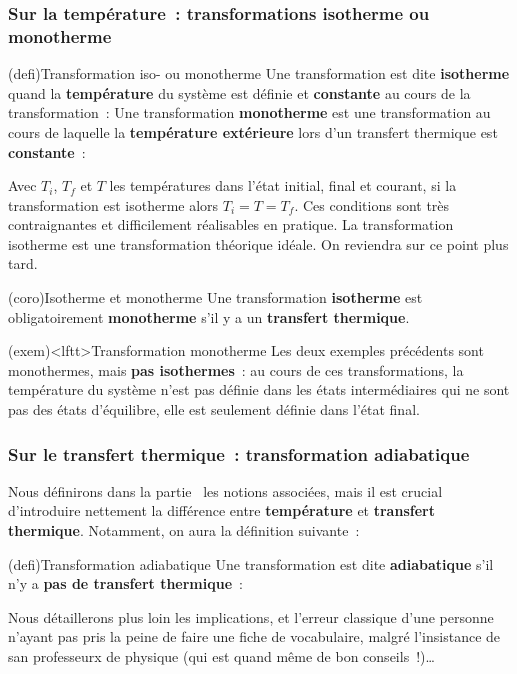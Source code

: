 \documentclass[../../main/main.tex]{subfiles}
\begin{document}
\subsubsection{Sur la température~: transformations isotherme ou monotherme}
\begin{tcb*}[sidebyside](defi){Transformation iso- ou monotherme}
	Une transformation est dite \textbf{isotherme} quand la \textbf{température} du
	système est définie et \textbf{constante} au cours de la transformation~:
	\psw{%
		\[
			\boxed{T = \cte \Lra \dd{T} = 0}
		\]
	}%
	\vspace{-15pt}
	\tcblower
	Une transformation \textbf{monotherme} est une transformation au cours de
	laquelle la \textbf{température extérieure} lors d'un transfert thermique est
	\textbf{constante}~: \psw{%
		\[
			\boxed{T\ind{ext} = \cte}
		\]
	}%
	\vspace{-15pt}
\end{tcb*}

Avec $T_i$, $T_f$ et $T$ les températures dans l'état initial, final et courant,
si la transformation est isotherme alors $T_i = T = T_f$. Ces conditions sont
très contraignantes et difficilement réalisables en pratique. La transformation
isotherme est une transformation théorique idéale. On reviendra sur ce point
plus tard.

\begin{tcb}[cnt](coro){Isotherme et monotherme}
	Une transformation \textbf{isotherme} est obligatoirement \textbf{monotherme}
	s'il y a un \textbf{transfert thermique}.
\end{tcb}

\begin{tcb}(exem)<lftt>{Transformation monotherme}
	Les deux exemples précédents sont monothermes, mais \textbf{pas isothermes}~:
	au cours de ces transformations, la température du système n'est pas définie
	dans les états intermédiaires qui ne sont pas des états d'équilibre, elle est
	seulement définie dans l'état final.
\end{tcb}

\subsubsection{Sur le transfert thermique~: transformation adiabatique}
Nous définirons dans la partie~ les notions
associées, mais il est crucial d'introduire nettement la différence entre
\textbf{température} et \textbf{transfert thermique}. Notamment, on aura la
définition suivante~:
\begin{tcb}(defi){Transformation adiabatique}
	Une transformation est dite \textbf{adiabatique} s'il n'y a \textbf{pas
		de transfert thermique}~:
	\psw{%
		\[
			\boxed{Q = 0}
		\]
	}%
	\vspace{-15pt}
\end{tcb}
Nous détaillerons plus loin les implications, et l'erreur classique d'une
personne n'ayant pas pris la peine de faire une fiche de vocabulaire, malgré
l'insistance de san professeurx de physique (qui est quand même de bon
conseils~!)…
\end{document}
